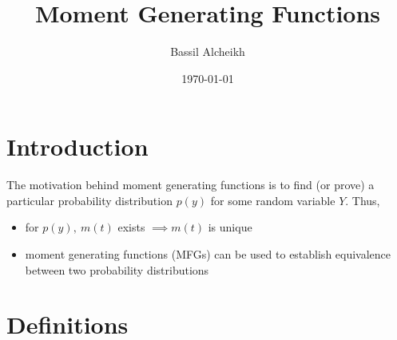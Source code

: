 \documentclass[a4paper]{article}
\title{Moment Generating Functions}
\author{Bassil Alcheikh}
\date{\today}
\theoremstyle{definition}
\begin{document}
\maketitle


\section{Introduction}
The motivation behind moment generating functions is to find (or prove) a particular probability distribution $p(y)$ for some random variable $Y$. Thus,
\begin{itemize}
   \item  for $p(y), \: m(t)$ exists $\implies m(t)$ is unique
   \item  moment generating functions (MFGs) can be used to establish equivalence between two probability distributions
\end{itemize}
\section{Definitions}
\end{document}
